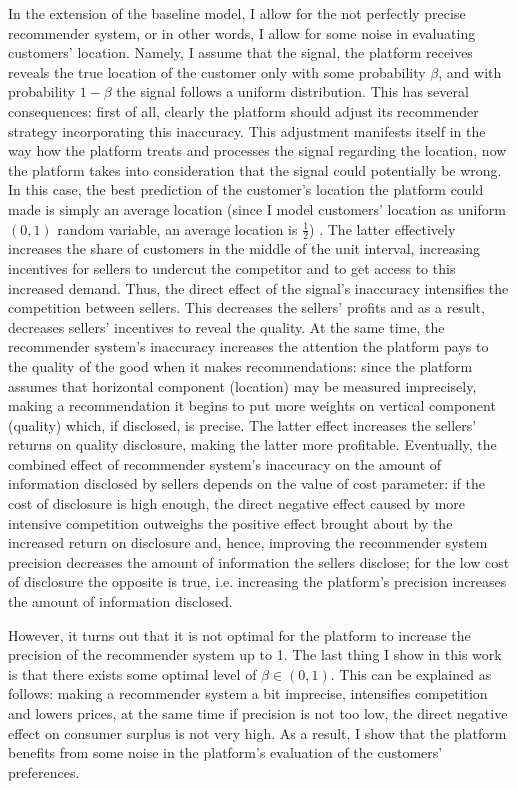 \documentclass[a4paper]{article}
\begin{document}
	
	
	
In the extension of the baseline model, I allow for the not perfectly precise recommender system, or in other words, I allow for some noise in evaluating customers' location. Namely, I assume that the signal, the platform receives reveals the true location of the customer only with some probability $\beta$, and with probability $1 - \beta$ the signal follows a uniform distribution. This has several consequences: first of all, clearly the platform should adjust its recommender strategy incorporating this inaccuracy. This adjustment manifests itself in the way how the platform treats and processes the signal regarding the location, now the platform takes into consideration that the signal could potentially be wrong. In this case, the best prediction of the customer's location the platform could made is simply an average location (since I model customers' location as uniform $(0, 1)$ random variable, an average location is $\frac{1}{2}$) . The latter effectively increases the share of customers in the middle of the unit interval, increasing incentives for sellers to undercut the competitor and to get access to this increased demand. Thus, the direct effect of the signal's inaccuracy intensifies the competition between sellers. This decreases the sellers' profits and as a result, decreases sellers' incentives to reveal the quality. At the same time, the recommender system's inaccuracy increases the attention the platform pays to the quality of the good when it makes recommendations: since the platform assumes that horizontal component (location) may be measured imprecisely, making a recommendation it begins to put more weights on vertical component (quality) which, if disclosed, is precise. The latter effect increases the sellers' returns on quality disclosure, making the latter more profitable. Eventually, the combined effect of recommender system's inaccuracy on the amount of information disclosed by sellers depends on the value of cost parameter: if the cost of disclosure is high enough, the direct negative effect caused by more intensive competition outweighs the positive effect brought about by the increased return on disclosure and, hence, improving the recommender system precision decreases the amount of information the sellers disclose; for the low cost of disclosure the opposite is true, i.e. increasing the platform's precision increases the amount of information disclosed. 
	
	
	
	
	
However, it turns out that it is not optimal for the platform to increase the precision of the recommender system up to 1. The last thing I show in this work is that there exists some optimal level of $\beta \in (0, 1)$. This can be explained as follows: making a recommender system a bit imprecise, intensifies competition and lowers prices, at the same time if precision is not too low, the direct negative effect on consumer surplus is not very high. As a result, I show that the platform benefits from some noise in the platform's evaluation of the customers' preferences.
\end{document}

